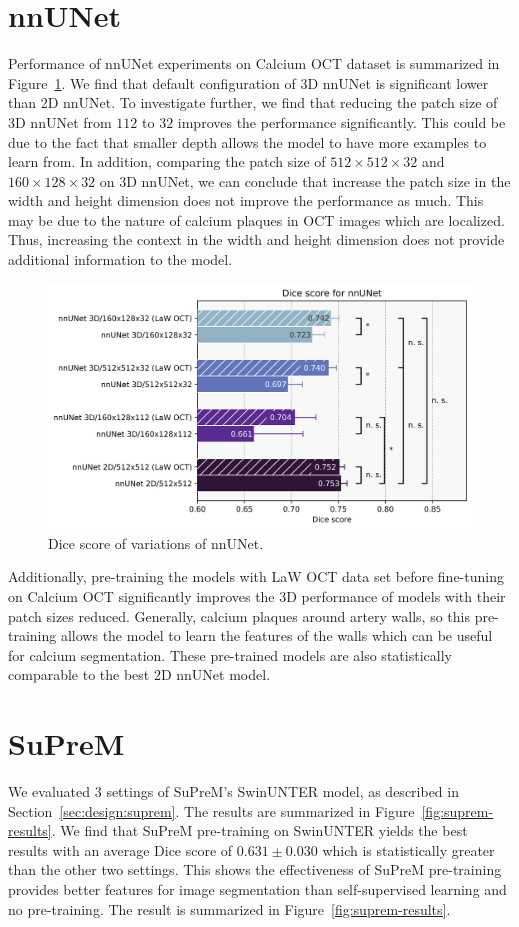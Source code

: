 \documentclass[a4paper,11pt,oneside]{report}
\begin{document}
\section{nnUNet}
Performance of nnUNet experiments on Calcium OCT dataset is summarized in Figure~\ref{fig:nnunet-results}. We find that default configuration of 3D nnUNet is significant lower than 2D nnUNet. To investigate further, we find that reducing the patch size of 3D nnUNet from $112$ to $32$ improves the performance significantly. This could be due to the fact that smaller depth allows the model to have more examples to learn from. In addition, comparing the patch size of $512\times 512\times 32$ and $160\times 128\times 32$ on 3D nnUNet, we can conclude that increase the patch size in the width and height dimension does not improve the performance as much. This may be due to the nature of calcium plaques in OCT images which are localized. Thus, increasing the context in the width and height dimension does not provide additional information to the model. 

\begin{figure}[h]
    \centering
    \includegraphics[width=0.8\linewidth]{figures/result_nnunet_results.png}
    \caption{Dice score of variations of nnUNet.}
    \label{fig:nnunet-results}
\end{figure}

Additionally, pre-training the models with LaW OCT data set before fine-tuning on Calcium OCT significantly improves the 3D performance of models with their patch sizes reduced. Generally, calcium plaques around artery walls, so this pre-training allows the model to learn the features of the walls which can be useful for calcium segmentation. These pre-trained models are also statistically comparable to the best 2D nnUNet model.

\section{SuPreM}
We evaluated 3 settings of SuPreM's SwinUNTER model, as described in Section~\ref{sec:design:suprem}. The results are summarized in Figure~\ref{fig:suprem-results}. We find that SuPreM pre-training on SwinUNTER yields the best results with an average Dice score of $0.631\pm0.030$ which is statistically greater than the other two settings. This shows the effectiveness of SuPreM pre-training provides better features for image segmentation than self-supervised learning and no pre-training. The result is summarized in Figure~\ref{fig:suprem-results}.
\end{document}
